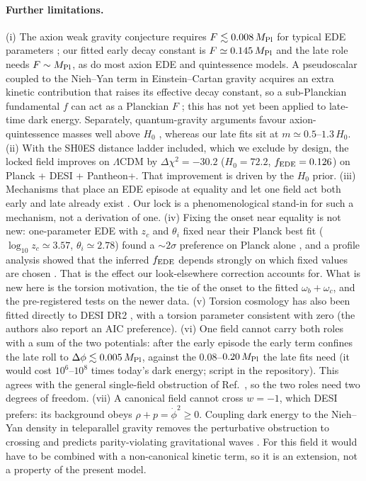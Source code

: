 \documentclass[11pt]{article}
\newcommand{\Mp}{M_{\rm Pl}}
\begin{document}
\paragraph{Further limitations.} (i) The axion weak gravity conjecture requires $F\lesssim0.008\,\Mp$ for typical
EDE parameters \cite{rudelius2022}; our fitted early decay constant is $F\simeq0.145\,\Mp$ and the late role needs
$F\sim\Mp$, as do most axion EDE and quintessence models. A pseudoscalar coupled to the Nieh--Yan term in
Einstein--Cartan gravity acquires an extra kinetic contribution that raises its effective decay constant, so a
sub-Planckian fundamental $f$ can act as a Planckian $F$ \cite{adshead2026}; this has not yet been applied to late-time
dark energy. Separately, quantum-gravity arguments favour axion-quintessence masses well above $H_0$ \cite{shiu2026},
whereas our late fits sit at $m\simeq0.5$--$1.3\,H_0$. (ii) With the SH0ES distance ladder included, which we
exclude by design, the locked field improves on $\Lambda$CDM by $\Delta\chi^2=-30.2$ ($H_0=72.2$, $f_{\rm EDE}=0.126$)
on Planck + DESI + Pantheon+. That improvement is driven by the $H_0$ prior. (iii) Mechanisms that place an EDE
episode at equality and let one field act both early and late already exist \cite{ramadan2023,brissenden2023}. Our
lock is a phenomenological stand-in for such a mechanism, not a derivation of one. (iv) Fixing the onset near equality
is not new: one-parameter EDE with $z_c$ and $\theta_i$ fixed near their Planck best fit ($\log_{10}z_c\simeq3.57$,
$\theta_i\simeq2.78$) found a $\sim2\sigma$ preference on Planck alone \cite{murgia2021,smith2021}, and a profile
analysis showed that the inferred $f_{\rm EDE}$ depends strongly on which fixed values are chosen \cite{herold2022}.
That is the effect our look-elsewhere correction accounts for. What is new here is the torsion motivation, the tie of the
onset to the fitted $\omega_b+\omega_c$, and the pre-registered tests on the newer data. (v) Torsion cosmology has also
been fitted directly to DESI DR2 \cite{liu2025torsion}, with a torsion parameter consistent with zero (the authors
also report an AIC preference). (vi) One field cannot carry both roles with a sum of the two potentials: after the
early episode the early term confines the late roll to $\Delta\phi\lesssim0.005\,\Mp$, against the
$0.08$--$0.20\,\Mp$ the late fits need (it would cost $10^6$--$10^8$ times today's dark energy; script in the
repository). This agrees with the general single-field obstruction of Ref.~\cite{giare2026}, so the two roles need two
degrees of freedom. (vii) A canonical field cannot cross $w=-1$, which DESI prefers: its background obeys
$\rho+p=\dot\phi^2\ge0$. Coupling dark energy to the Nieh--Yan density in teleparallel gravity removes the perturbative
obstruction to crossing and predicts parity-violating gravitational waves \cite{kang2026}. For this field it would have
to be combined with a non-canonical kinetic term, so it is an extension, not a property of the present model.
\end{document}
